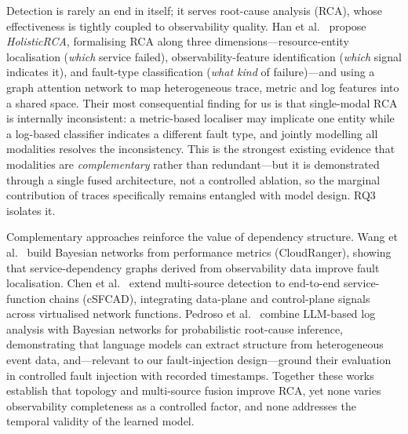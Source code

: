 \documentclass[acmsmall]{acmart}
\begin{document}
Detection is rarely an end in itself; it serves root-cause analysis (RCA), whose effectiveness is tightly coupled to observability quality. Han et al.\ \cite{han2024} propose \emph{HolisticRCA}, formalising RCA along three dimensions---resource-entity localisation (\emph{which} service failed), observability-feature identification (\emph{which} signal indicates it), and fault-type classification (\emph{what kind} of failure)---and using a graph attention network to map heterogeneous trace, metric and log features into a shared space. Their most consequential finding for us is that single-modal RCA is internally inconsistent: a metric-based localiser may implicate one entity while a log-based classifier indicates a different fault type, and jointly modelling all modalities resolves the inconsistency. This is the strongest existing evidence that modalities are \emph{complementary} rather than redundant---but it is demonstrated through a single fused architecture, not a controlled ablation, so the marginal contribution of traces specifically remains entangled with model design. RQ3 isolates it.

Complementary approaches reinforce the value of dependency structure. Wang et al.\ \cite{wang2018} build Bayesian networks from performance metrics (CloudRanger), showing that service-dependency graphs derived from observability data improve fault localisation. Chen et al.\ \cite{chen2025} extend multi-source detection to end-to-end service-function chains (cSFCAD), integrating data-plane and control-plane signals across virtualised network functions. Pedroso et al.\ \cite{pedroso2025} combine LLM-based log analysis with Bayesian networks for probabilistic root-cause inference, demonstrating that language models can extract structure from heterogeneous event data, and---relevant to our fault-injection design---ground their evaluation in controlled fault injection with recorded timestamps. Together these works establish that topology and multi-source fusion improve RCA, yet none varies observability completeness as a controlled factor, and none addresses the temporal validity of the learned model.
\end{document}
